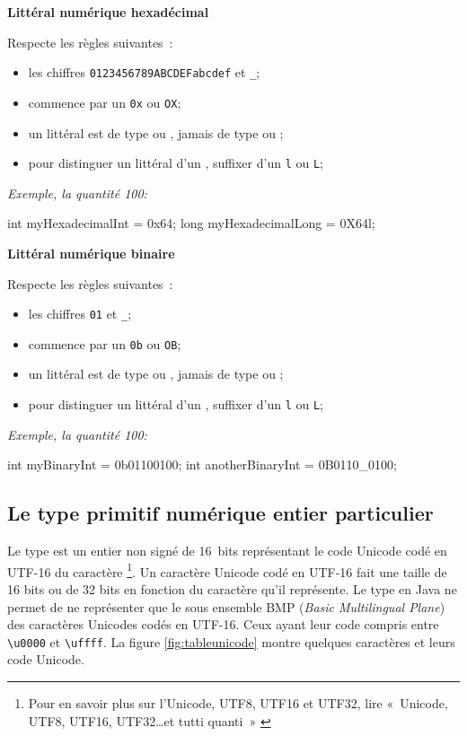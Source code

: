 \textbf{Littéral numérique hexadécimal}

Respecte les règles suivantes~:

\begin{itemize}
	\item les chiffres \texttt{0123456789ABCDEFabcdef} et \texttt{\_};
	\item commence par un \texttt{0x} ou \texttt{OX};
	\item un littéral est de type  ou , jamais de type 
		 ou ;
	\item pour distinguer un littéral  d'un , suffixer 
		d'un \texttt{l} ou \texttt{L};
\end{itemize}

\textit{Exemple, la quantité 100: }
\begin{java}
	int myHexadecimalInt = 0x64;
	long myHexadecimalLong = 0X64l;
\end{java}

\clearpage
\textbf{Littéral numérique binaire}

Respecte les règles suivantes~:

\begin{itemize}
	\item les chiffres \texttt{01} et \texttt{\_};
	\item commence par un \texttt{0b} ou \texttt{OB};
	\item un littéral est de type  ou , jamais de type 
		 ou ;
	\item pour distinguer un littéral  d'un , suffixer 
		d'un \texttt{l} ou \texttt{L};
\end{itemize}

\textit{Exemple, la quantité 100: } 
\begin{java}
	int myBinaryInt = 0b01100100;
	int anotherBinaryInt = 0B0110\_0100;
\end{java}

\subsection{Le type primitif numérique entier particulier }

Le type  est un entier non signé de 16~bits représentant le code 
Unicode codé en UTF-16 du caractère
	\footnote{%
		Pour en savoir plus sur l'Unicode, UTF8, UTF16 et UTF32, lire
		«~Unicode, UTF8, UTF16, UTF32\ldots et tutti quanti~» \cite{pbt-unicode}
	}. 
Un caractère Unicode codé en UTF-16 fait une taille de 16 bits ou de 32 bits en
fonction du caractère qu'il représente. Le type  en Java ne permet de
ne représenter que le sous ensemble BMP (\textit{Basic Multilingual Plane}) des
caractères Unicodes codés en UTF-16. Ceux ayant leur code compris entre
\texttt{\textbackslash u0000} et \texttt{\textbackslash uffff}. La figure 
\vref{fig:tableunicode} montre quelques caractères et leurs code Unicode. 

